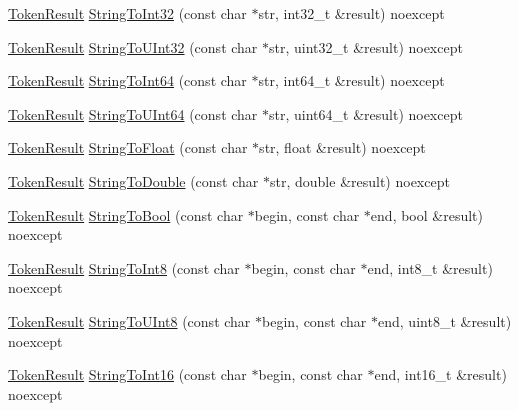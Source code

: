 \begin{DoxyCompactItemize}
\hyperlink{namespacemage_a2178ba2411db5912f41b2e7698c2037d}{Token\+Result} \hyperlink{namespacemage_a32b9e55010df1a39c33c4c0ed84670cb}{String\+To\+Int32} (const char $\ast$str, int32\+\_\+t \&result) noexcept
\item 
\hyperlink{namespacemage_a2178ba2411db5912f41b2e7698c2037d}{Token\+Result} \hyperlink{namespacemage_ab3d417f8cc121f08027f2b328d01abd3}{String\+To\+U\+Int32} (const char $\ast$str, uint32\+\_\+t \&result) noexcept
\item 
\hyperlink{namespacemage_a2178ba2411db5912f41b2e7698c2037d}{Token\+Result} \hyperlink{namespacemage_a6f4d0f0ffac21d9aa1cc23abef34b8f0}{String\+To\+Int64} (const char $\ast$str, int64\+\_\+t \&result) noexcept
\item 
\hyperlink{namespacemage_a2178ba2411db5912f41b2e7698c2037d}{Token\+Result} \hyperlink{namespacemage_abf31a7c0a7853bb86a95db2d0b35a540}{String\+To\+U\+Int64} (const char $\ast$str, uint64\+\_\+t \&result) noexcept
\item 
\hyperlink{namespacemage_a2178ba2411db5912f41b2e7698c2037d}{Token\+Result} \hyperlink{namespacemage_ac29b5e59075bad7d9073a9b33be3b816}{String\+To\+Float} (const char $\ast$str, float \&result) noexcept
\item 
\hyperlink{namespacemage_a2178ba2411db5912f41b2e7698c2037d}{Token\+Result} \hyperlink{namespacemage_ae5b41178cf05b9f557b375393a0708c5}{String\+To\+Double} (const char $\ast$str, double \&result) noexcept
\item 
\hyperlink{namespacemage_a2178ba2411db5912f41b2e7698c2037d}{Token\+Result} \hyperlink{namespacemage_aca85dde2ef8b47e676fa2545dc8d7cbe}{String\+To\+Bool} (const char $\ast$begin, const char $\ast$end, bool \&result) noexcept
\item 
\hyperlink{namespacemage_a2178ba2411db5912f41b2e7698c2037d}{Token\+Result} \hyperlink{namespacemage_a8c83917feb7fb81a42d1eeaba3e579ed}{String\+To\+Int8} (const char $\ast$begin, const char $\ast$end, int8\+\_\+t \&result) noexcept
\item 
\hyperlink{namespacemage_a2178ba2411db5912f41b2e7698c2037d}{Token\+Result} \hyperlink{namespacemage_ab4acd8280618fbb8a09f49f647638c61}{String\+To\+U\+Int8} (const char $\ast$begin, const char $\ast$end, uint8\+\_\+t \&result) noexcept
\item 
\hyperlink{namespacemage_a2178ba2411db5912f41b2e7698c2037d}{Token\+Result} \hyperlink{namespacemage_aea7a0006cf7f48875ae64d4f6d8a2c9c}{String\+To\+Int16} (const char $\ast$begin, const char $\ast$end, int16\+\_\+t \&result) noexcept
\item 

\end{DoxyCompactItemize}
